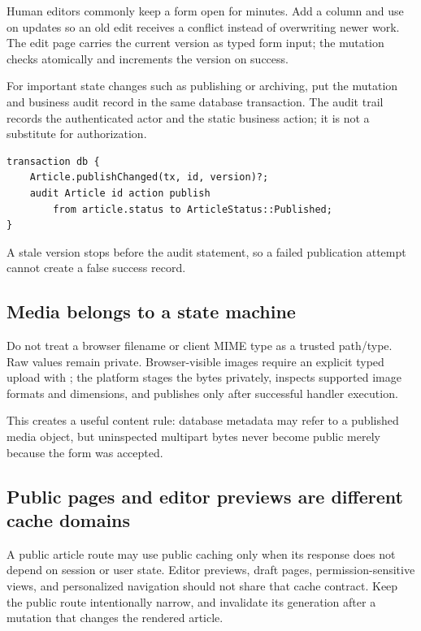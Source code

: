 Human editors commonly keep a form open for minutes. Add a  column and use  on updates so an old edit receives a conflict instead of overwriting newer work. The edit page carries the current version as typed form input; the mutation checks  atomically and increments the version on success.

For important state changes such as publishing or archiving, put the mutation and business audit record in the same database transaction. The audit trail records the authenticated actor and the static business action; it is not a substitute for authorization.

\begin{lstlisting}[language=Velran]
transaction db {
    Article.publishChanged(tx, id, version)?;
    audit Article id action publish
        from article.status to ArticleStatus::Published;
}
\end{lstlisting}

A stale version stops before the audit statement, so a failed publication attempt cannot create a false success record.

\subsection*{Media belongs to a state machine}

Do not treat a browser filename or client MIME type as a trusted path/type. Raw  values remain private. Browser-visible images require an explicit typed  upload with ; the platform stages the bytes privately, inspects supported image formats and dimensions, and publishes only after successful handler execution.

This creates a useful content rule: database metadata may refer to a published media object, but uninspected multipart bytes never become public merely because the form was accepted.

\subsection*{Public pages and editor previews are different cache domains}

A public article route may use public caching only when its response does not depend on session or user state. Editor previews, draft pages, permission-sensitive views, and personalized navigation should not share that cache contract. Keep the public route intentionally narrow, and invalidate its generation after a mutation that changes the rendered article.

